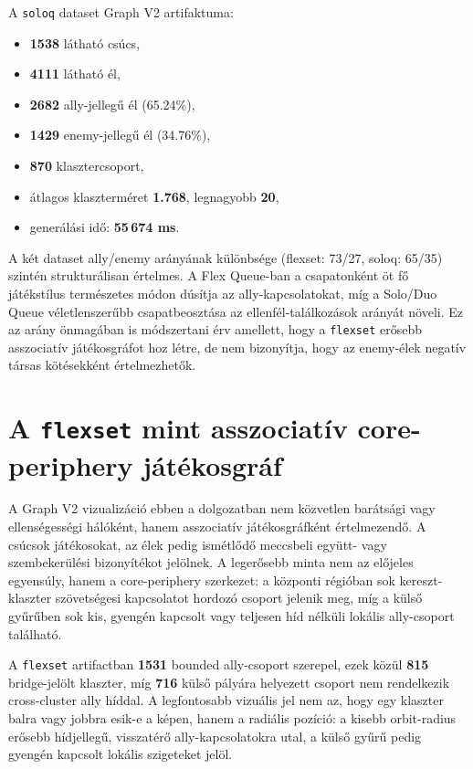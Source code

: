 A \texttt{soloq} dataset Graph V2 artifaktuma:

\begin{itemize}
    \item \textbf{1538} látható csúcs,
    \item \textbf{4111} látható él,
    \item \textbf{2682} ally-jellegű él (65.24\%),
    \item \textbf{1429} enemy-jellegű él (34.76\%),
    \item \textbf{870} klasztercsoport,
    \item átlagos klaszterméret \textbf{1.768}, legnagyobb \textbf{20},
    \item generálási idő: \textbf{55\,674 ms}.
\end{itemize}

A két dataset ally/enemy arányának különbsége (flexset: 73/27, soloq: 65/35) szintén strukturálisan értelmes. A Flex Queue-ban a csapatonként öt fő játékstílus természetes módon dúsítja az ally-kapcsolatokat, míg a Solo/Duo Queue véletlenszerűbb csapatbeosztása az ellenfél-találkozások arányát növeli. Ez az arány önmagában is módszertani érv amellett, hogy a \texttt{flexset} erősebb asszociatív játékosgráfot hoz létre, de nem bizonyítja, hogy az enemy-élek negatív társas kötésekként értelmezhetők.

\section{A \texttt{flexset} mint asszociatív core-periphery játékosgráf}

A Graph V2 vizualizáció ebben a dolgozatban nem közvetlen barátsági vagy ellenségességi hálóként, hanem asszociatív játékosgráfként értelmezendő. A csúcsok játékosokat, az élek pedig ismétlődő meccsbeli együtt- vagy szembekerülési bizonyítékot jelölnek. A legerősebb minta nem az előjeles egyensúly, hanem a core-periphery szerkezet: a központi régióban sok kereszt-klaszter szövetségesi kapcsolatot hordozó csoport jelenik meg, míg a külső gyűrűben sok kis, gyengén kapcsolt vagy teljesen híd nélküli lokális ally-csoport található.

A \texttt{flexset} artifactban \textbf{1531} bounded ally-csoport szerepel, ezek közül \textbf{815} bridge-jelölt klaszter, míg \textbf{716} külső pályára helyezett csoport nem rendelkezik cross-cluster ally híddal. A legfontosabb vizuális jel nem az, hogy egy klaszter balra vagy jobbra esik-e a képen, hanem a radiális pozíció: a kisebb orbit-radius erősebb hídjellegű, visszatérő ally-kapcsolatokra utal, a külső gyűrű pedig gyengén kapcsolt lokális szigeteket jelöl.

